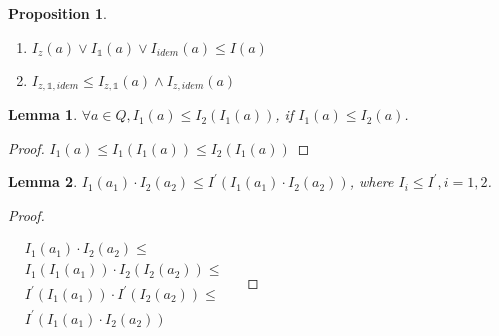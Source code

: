 \documentclass[a4paper]{article}
\newtheorem{prop}{Proposition}
\newtheorem{lemma}{Lemma}
\begin{document}
\begin{prop}
$ $

\begin{enumerate}
  \item $I_z (a) \vee I_{\mathds{1}} (a) \vee I_{idem} (a) \leq I(a)$
  \item $I_{z, \mathds{1}, idem} \leq I_{z, \mathds{1}} (a) \wedge I_{z, idem} (a)$
\end{enumerate}
\end{prop}

\begin{lemma}
  $\forall a \in Q, I_1 (a) \leq I_2 (I_1 (a))$, if $I_1 (a) \leq I_2 (a)$.
\end{lemma}

\begin{proof}
  $I_1 (a) \leq I_1 (I_1 (a)) \leq I_2 (I_1 (a))$
\end{proof}

\begin{lemma}
  $I_1(a_1) \cdot I_2(a_2) \leq I^{'} (I_1(a_1) \cdot I_2(a_2))$, where $I_i \leq I^{'}, i = 1,2$.
\end{lemma}

\begin{proof}
$ $

  $\begin{array}{lll}
  &I_1(a_1) \cdot I_2(a_2) \leq & \\
  &I_1 (I_1 (a_1)) \cdot I_2 (I_2 (a_2)) \leq & \\
  &I^{'} (I_1 (a_1)) \cdot I^{'} (I_2 (a_2)) \leq & \\
  &I^{'}(I_1 (a_1) \cdot I_2 (a_2))&
  \end{array}$
\end{proof}
\end{document}

